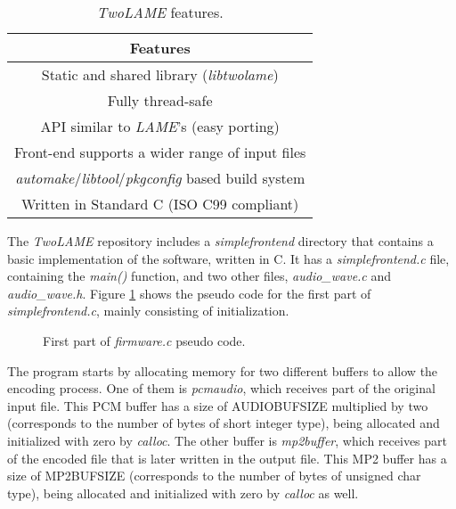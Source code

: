 \vspace{0.5cm}

\begin{table}[H]
    \centering
    \begin{tabular}{|c|}
        \hline
        \textbf{Features} \\
        \hline
         Static and shared library (\textit{libtwolame}) \\
         \hline
         Fully thread-safe\\
         \hline
         API similar to \textit{LAME}'s (easy porting) \\
         \hline
         Front-end supports a wider range of input files \\
         \hline
         \textit{automake}/\textit{libtool}/\textit{pkgconfig} based build system \\
         \hline
         Written in Standard C (ISO C99 compliant)\\
         \hline
    \end{tabular}
    \caption{\textit{TwoLAME} features.}
    \label{tab:twolame}
\end{table}

The \textit{TwoLAME} repository includes a \textit{simplefrontend} directory that contains a basic implementation of the software, written in C.
It has a \textit{simplefrontend.c} file, containing the \textit{main()} function, and two other files, \textit{audio\_wave.c} and \textit{audio\_wave.h}.
Figure \ref{pseudo1} shows the pseudo code for the first part of \textit{simplefrontend.c}, mainly consisting of initialization.

\begin{figure}[H]
\centerline{}
\caption{First part of \textit{firmware.c} pseudo code.}
\label{pseudo1}
\end{figure}


The program starts by allocating memory for two different buffers to allow the encoding process. One of them is \textit{pcmaudio}, which receives part of the original input file. This PCM buffer has a size of AUDIOBUFSIZE multiplied by two (corresponds to the number of bytes of short integer type), being allocated and initialized with zero by \textit{calloc}. The other buffer is \textit{mp2buffer}, which receives part of the encoded file that is later written in the output file. This MP2 buffer has a size of MP2BUFSIZE (corresponds to the number of bytes of unsigned char type), being allocated and initialized with zero by \textit{calloc} as well.

